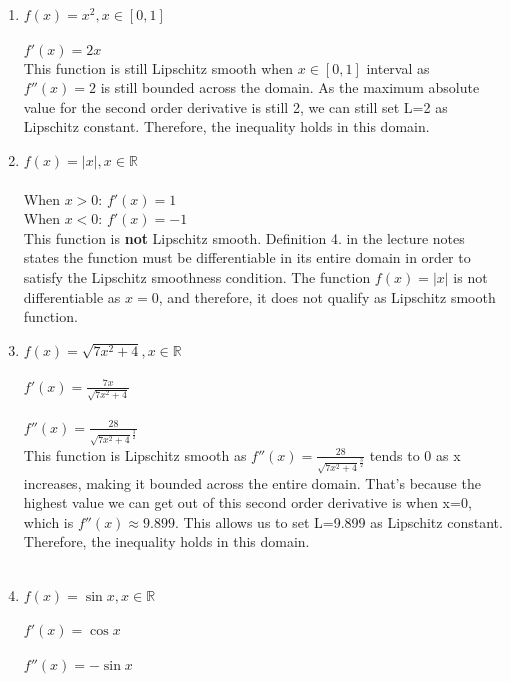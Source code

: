\documentclass{assignment}
\newcommand{\R}{\mathbb{R}}
\begin{document}
\begin{problem}
\begin{enumerate}
\begin{enumerate}
    \item $f(x) = x^2, x \in [0,1]$\\\\
    $f'(x) = 2x$\\

    This function is still Lipschitz smooth when $x\in [0,1]$ interval as $f''(x) = 2$ is still bounded across the domain. As the maximum absolute value for the second order derivative is still 2, we can still set L=2 as Lipschitz constant. Therefore, the inequality holds in this domain.\\

    \item $f(x) = |x|, x \in \R$\\\\
    When $x>0$:
    $f'(x) = 1$\\

    When $x<0$:
    $f'(x) = -1$\\

    This function is \textbf{not} Lipschitz smooth. Definition 4. in the lecture notes states the function must be differentiable in its entire domain in order to satisfy the Lipschitz smoothness condition. The function $f(x) = |x|$ is not differentiable as $x=0$, and therefore, it does not qualify as Lipschitz smooth function.\\
    
    \item $f(x) = \sqrt{7x^2 + 4}, x\in\R$\\\\
    $f'(x) = \frac{7x}{\sqrt{7x^2+4}}$\\\\
    $f''(x) = \frac{28}{\sqrt{7x^2+4}^\frac{3}{2}}$\\

    This function is Lipschitz smooth as $f''(x) = \frac{28}{\sqrt{7x^2+4}^\frac{3}{2}}$ tends to 0 as x increases, making it bounded across the entire domain. That's because the highest value we can get out of this second order derivative is when x=0, which is $f''(x) \approx 9.899$. This allows us to set L=9.899 as Lipschitz constant. Therefore, the inequality holds in this domain.\\\\

    \item $f(x) = \sin x, x\in\R$\\\\
    $f'(x) = \cos x$\\\\
    $f''(x) = -\sin x$\\


\end{enumerate}
\end{enumerate}
\end{problem}
\end{document}
